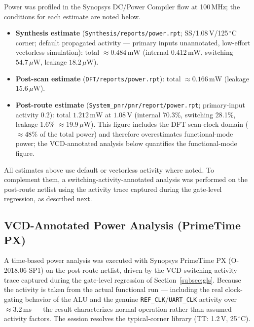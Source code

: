 \documentclass[11pt,a4paper]{article}
\begin{document}
Power was profiled in the Synopsys DC/Power Compiler flow at 100\,MHz; the conditions for each estimate are noted below.
\begin{itemize}
    \item \textbf{Synthesis estimate} (\texttt{Synthesis/reports/power.rpt}; SS/1.08\,V/125\,$^\circ$C corner; default propagated activity --- primary inputs unannotated, low-effort vectorless simulation): total $\approx 0.484\,\text{mW}$ (internal $0.412\,\text{mW}$, switching $54.7\,\mu\text{W}$, leakage $18.2\,\mu\text{W}$).
    \item \textbf{Post-scan estimate} (\texttt{DFT/reports/power.rpt}): total $\approx 0.166\,\text{mW}$ (leakage $15.6\,\mu\text{W}$).
    \item \textbf{Post-route estimate} (\texttt{System\_pnr/pnr/report/power.rpt}; primary-input activity 0.2): total $1.212\,\text{mW}$ at $1.08\,\text{V}$ (internal 70.3\%, switching 28.1\%, leakage 1.6\% $\approx 19.9\,\mu\text{W}$). This figure includes the DFT scan-clock domain ($\approx 48\%$ of the total power) and therefore overestimates functional-mode power; the VCD-annotated analysis below quantifies the functional-mode figure.
\end{itemize}

All estimates above use default or vectorless activity where noted. To complement them, a switching-activity-annotated analysis was performed on the post-route netlist using the activity trace captured during the gate-level regression, as described next.

\subsection{VCD-Annotated Power Analysis (PrimeTime PX)}
\label{subsec:px}

A time-based power analysis was executed with Synopsys PrimeTime PX (O-2018.06-SP1) on the post-route netlist, driven by the VCD switching-activity trace captured during the gate-level regression of Section~\ref{subsec:gls}. Because the activity is taken from the actual functional run --- including the real clock-gating behavior of the ALU and the genuine \texttt{REF\_CLK}/\texttt{UART\_CLK} activity over $\approx 3.2$\,ms --- the result characterizes normal operation rather than assumed activity factors. The session resolves the typical-corner library (TT: 1.2\,V, 25\,$^\circ$C).
\end{document}
